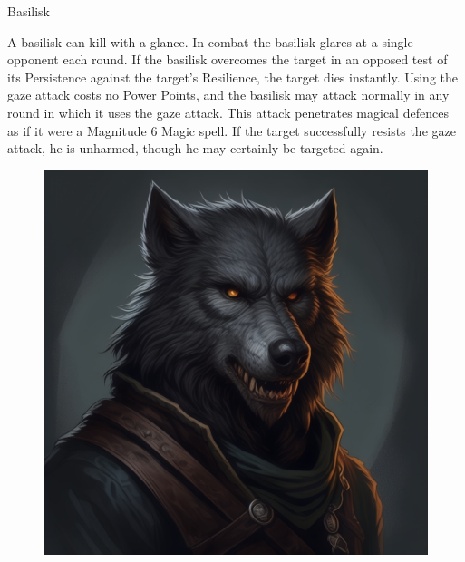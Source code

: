 \begin{monsterbox}{Basilisk}
\begin{rpg-monsteraction}
	\end{rpg-monsteraction}
	\begin{rpg-monsteraction}
		A basilisk can kill with a glance. In combat the basilisk glares at a single opponent each round. If the basilisk overcomes the target in an opposed test of its Persistence against the target’s Resilience, the target dies instantly. Using the gaze attack costs no Power Points, and the basilisk may attack normally in any round in which it uses the gaze attack. This attack penetrates magical defences as if it were a Magnitude 6 Magic spell. If the target successfully resists the gaze attack, he is unharmed, though he may certainly be targeted again. 
	\end{rpg-monsteraction}

\end{monsterbox}


\begin{figure}[h]
\begin{center}
\includegraphics[scale=0.24]{img/ai-images/wolfman.png}
\end{center}
\end{figure}

